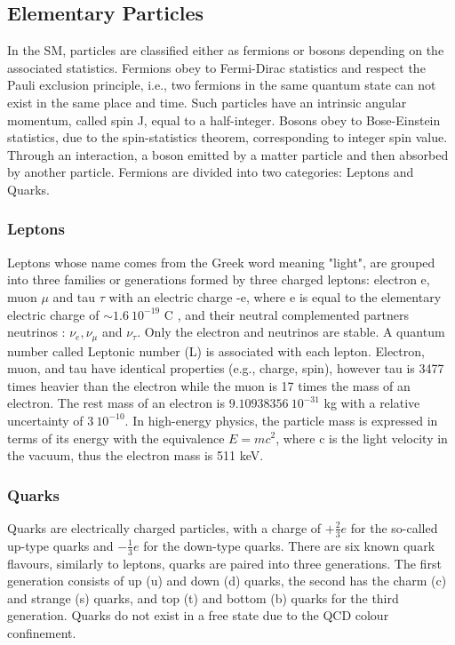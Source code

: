 \subsection{Elementary Particles}
\label{chap1:SM:EP}
In the SM, particles are classified either as fermions or bosons depending on the associated statistics. Fermions obey to Fermi-Dirac statistics and respect the Pauli exclusion principle, i.e., two fermions in the same quantum state can not exist in the same place and time. Such particles have an intrinsic angular momentum, called spin J, equal to a half-integer. Bosons obey to Bose-Einstein statistics, due to the spin-statistics theorem, corresponding to integer spin value. Through an interaction, a boson emitted by a matter particle and then absorbed by another particle. Fermions are divided into two categories: Leptons and Quarks.

\subsubsection{Leptons}
Leptons whose name comes from the Greek word meaning "light", are grouped into three families or generations formed by three charged leptons: electron e, muon $\mu$ and tau $\tau$ with an electric charge -e, where e is equal to the elementary electric charge of $\sim 1.6 \ 10^{-19} $ C \cite{PDG}, and their neutral complemented partners neutrinos : $\nu_{e}, \nu_{\mu}$ and $\nu_{\tau}$. Only the electron and neutrinos are stable. A quantum number called Leptonic number (L) is associated with each lepton. Electron, muon, and tau have identical properties (e.g., charge, spin), however tau is 3477 times heavier than the electron while the muon is 17 times the mass of an electron. The rest mass of an electron is $9.10938356 \ 10^{-31} $ kg with a relative uncertainty of $3 \ 10^{-10}$. In high-energy physics, the particle mass is expressed in terms of its energy with the equivalence $E=mc^2$, where c is the light velocity in the vacuum, thus the electron mass is 511 keV.

\subsubsection{Quarks}
Quarks are electrically charged particles, with a charge of $+\frac{2}{3}e$ for the so-called up-type quarks and $-\frac{1}{3}e$ for the down-type quarks. There are six known quark flavours, similarly to leptons, quarks are paired into three generations. The first generation consists of up (u) and down (d) quarks, the second has the charm (c) and strange (s) quarks, and top (t) and bottom (b) quarks for the third generation. Quarks do not exist in a free state due to the QCD colour confinement.

